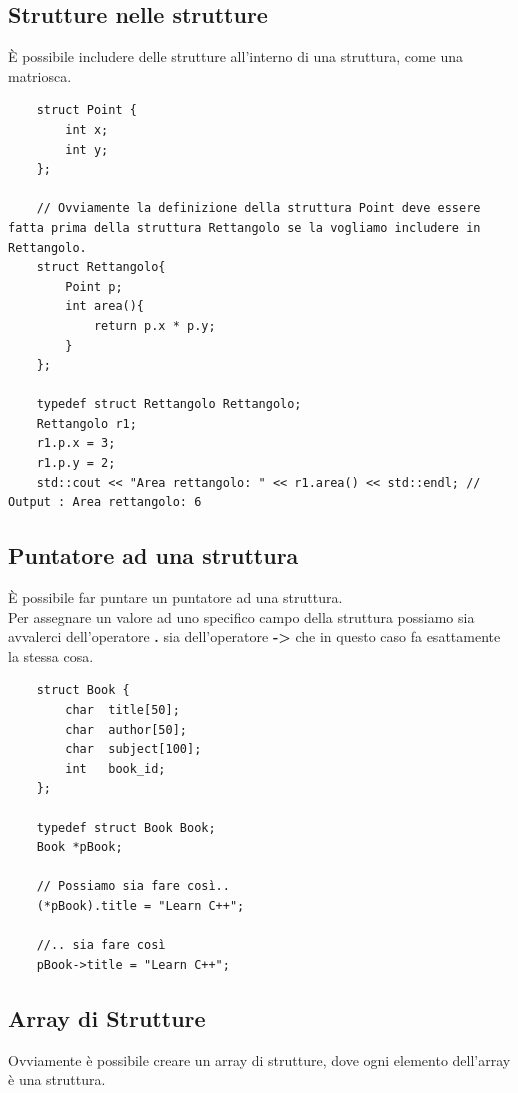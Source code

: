 \subsection{Strutture nelle strutture}

\textsf{\small È possibile includere delle strutture all'interno di una struttura, come una matriosca.} \\

\begin{lstlisting}
	struct Point {
		int x;
		int y;
	};

	// Ovviamente la definizione della struttura Point deve essere fatta prima della struttura Rettangolo se la vogliamo includere in Rettangolo.
	struct Rettangolo{
		Point p;
		int area(){
			return p.x * p.y;
		}
	};

	typedef struct Rettangolo Rettangolo;
	Rettangolo r1;
	r1.p.x = 3;
	r1.p.y = 2;
	std::cout << "Area rettangolo: " << r1.area() << std::endl; // Output : Area rettangolo: 6
\end{lstlisting}

\subsection{Puntatore ad una struttura}

\textsf{\small È possibile far puntare un puntatore ad una struttura.} \\

\textsf{\small Per assegnare un valore ad uno specifico campo della struttura possiamo sia avvalerci dell'operatore \textbf{.} sia dell'operatore \textbf{->} che in questo caso fa esattamente la stessa cosa.} \\

\begin{lstlisting}
	struct Book {
		char  title[50];
		char  author[50];
		char  subject[100];
		int   book_id;
	};

	typedef struct Book Book;
	Book *pBook;
	
	// Possiamo sia fare così..
	(*pBook).title = "Learn C++";
	
	//.. sia fare così
	pBook->title = "Learn C++";
\end{lstlisting}

\subsection{Array di Strutture}

\textsf{\small Ovviamente è possibile creare un array di strutture, dove ogni elemento dell'array è una struttura.} \\

